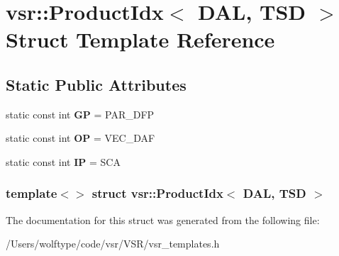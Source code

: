 \hypertarget{structvsr_1_1_product_idx_3_01_d_a_l_00_01_t_s_d_01_4}{\section{vsr\-:\-:Product\-Idx$<$ D\-A\-L, T\-S\-D $>$ Struct Template Reference}
\label{structvsr_1_1_product_idx_3_01_d_a_l_00_01_t_s_d_01_4}
}
\subsection*{Static Public Attributes}
\begin{DoxyCompactItemize}
\item 
\hypertarget{structvsr_1_1_product_idx_3_01_d_a_l_00_01_t_s_d_01_4_ab3cd9925c7a0a83c80df547470a73e20}{static const int {\bfseries G\-P} = P\-A\-R\-\_\-\-D\-F\-P}\label{structvsr_1_1_product_idx_3_01_d_a_l_00_01_t_s_d_01_4_ab3cd9925c7a0a83c80df547470a73e20}

\item 
\hypertarget{structvsr_1_1_product_idx_3_01_d_a_l_00_01_t_s_d_01_4_a0f6f201f9a26f5709db0a0d114397994}{static const int {\bfseries O\-P} = V\-E\-C\-\_\-\-D\-A\-F}\label{structvsr_1_1_product_idx_3_01_d_a_l_00_01_t_s_d_01_4_a0f6f201f9a26f5709db0a0d114397994}

\item 
\hypertarget{structvsr_1_1_product_idx_3_01_d_a_l_00_01_t_s_d_01_4_a3a3f92aebf31723376fccfe21642e3cc}{static const int {\bfseries I\-P} = S\-C\-A}\label{structvsr_1_1_product_idx_3_01_d_a_l_00_01_t_s_d_01_4_a3a3f92aebf31723376fccfe21642e3cc}

\end{DoxyCompactItemize}
\subsubsection*{template$<$$>$ struct vsr\-::\-Product\-Idx$<$ D\-A\-L, T\-S\-D $>$}



The documentation for this struct was generated from the following file\-:\begin{DoxyCompactItemize}
\item 
/\-Users/wolftype/code/vsr/\-V\-S\-R/vsr\-\_\-templates.\-h\end{DoxyCompactItemize}
